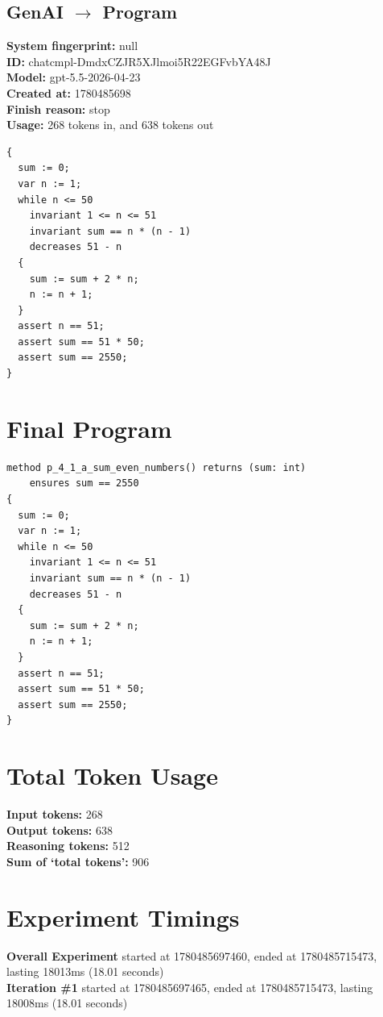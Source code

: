 \documentclass{article}
\begin{document}
\subsection*{GenAI $\rightarrow$ Program}
\textbf{System fingerprint: }null
\\\textbf{ID: }chatcmpl-DmdxCZJR5XJlmoi5R22EGFvbYA48J
\\\textbf{Model: }gpt-5.5-2026-04-23
\\\textbf{Created at: }1780485698
\\\textbf{Finish reason: }stop
\\\textbf{Usage: }268 tokens in, and 638 tokens out
\begin{lstlisting}
{
  sum := 0;
  var n := 1;
  while n <= 50
    invariant 1 <= n <= 51
    invariant sum == n * (n - 1)
    decreases 51 - n
  {
    sum := sum + 2 * n;
    n := n + 1;
  }
  assert n == 51;
  assert sum == 51 * 50;
  assert sum == 2550;
}
\end{lstlisting}
\section*{Final Program}
\begin{lstlisting}
method p_4_1_a_sum_even_numbers() returns (sum: int)
	ensures sum == 2550
{
  sum := 0;
  var n := 1;
  while n <= 50
    invariant 1 <= n <= 51
    invariant sum == n * (n - 1)
    decreases 51 - n
  {
    sum := sum + 2 * n;
    n := n + 1;
  }
  assert n == 51;
  assert sum == 51 * 50;
  assert sum == 2550;
}
\end{lstlisting}
\section*{Total Token Usage}
\textbf{Input tokens: }268
\\\textbf{Output tokens: }638
\\\textbf{Reasoning tokens: }512
\\\textbf{Sum of `total tokens': }906
\section*{Experiment Timings}
\textbf{Overall Experiment} started at 1780485697460, ended at 1780485715473, lasting 18013ms (18.01 seconds)
\\\textbf{Iteration \#1} started at 1780485697465, ended at 1780485715473, lasting 18008ms (18.01 seconds)
\end{document}
